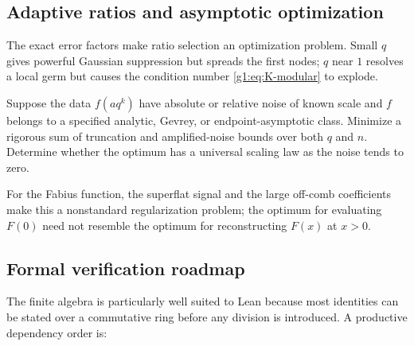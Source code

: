 \subsection{Adaptive ratios and asymptotic optimization}

The exact error factors make ratio selection an optimization problem.  Small
$q$ gives powerful Gaussian suppression but spreads the first nodes; $q$ near
$1$ resolves a local germ but causes the condition number
\eqref{g1:eq:K-modular} to explode.

\begin{problem}
\label{g2:prob:optimal-q}
Suppose the data $f(aq^k)$ have absolute or relative noise of known scale and
$f$ belongs to a specified analytic, Gevrey, or endpoint-asymptotic class.
Minimize a rigorous sum of truncation and amplified-noise bounds over both
$q$ and $n$.  Determine whether the optimum has a universal scaling law as the
noise tends to zero.
\end{problem}

For the Fabius function, the superflat signal and the large off-comb
coefficients make this a nonstandard regularization problem; the optimum for
evaluating $F(0)$ need not resemble the optimum for reconstructing $F(x)$ at
$x>0$.

\subsection{Formal verification roadmap}

The finite algebra is particularly well suited to Lean because most identities
can be stated over a commutative ring before any division is introduced.  A
productive dependency order is:

